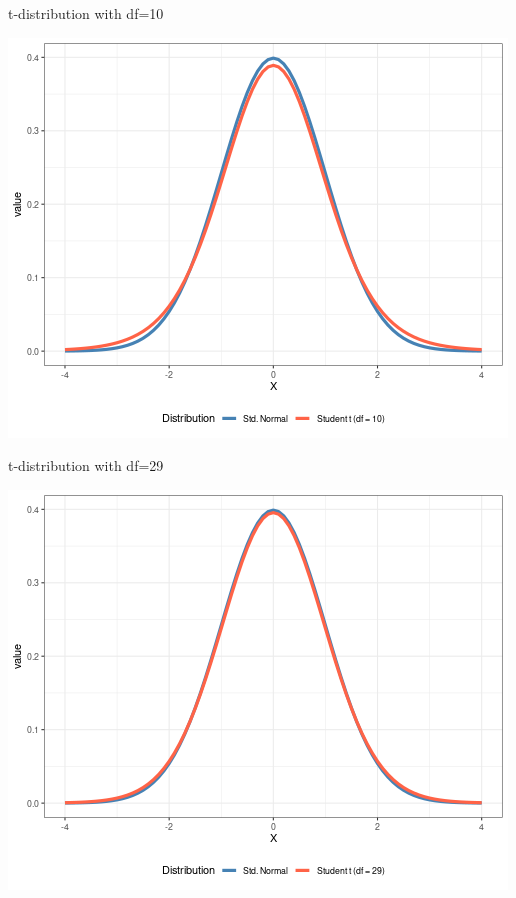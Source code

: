 \documentclass{beamer}
\begin{document}
\begin{frame}{t-distribution with df=10}
\begin{center}
\includegraphics[scale=0.5]{t10.png}
\end{center}
\end{frame}

\begin{frame}{t-distribution with df=29}
\begin{center}
\includegraphics[scale=0.5]{t30.png}
\end{center}
\end{frame}
\end{document}
